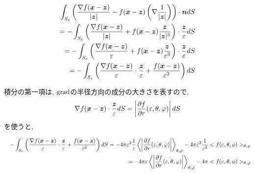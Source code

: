 \documentclass{jsarticle} \usepackage[dvipdfmx]{graphicx} \usepackage[dvipdfmx]{hyperref}
\newcommand*{\mbold}[1]{\mbox{\boldmath $#1$}}
\newcommand*{\grad}{{\rm grad}}
\begin{document}
\begin{eqnarray}
  \int_{S_\varepsilon} \left( \frac{\nabla f(\mbold{x} - \mbold{z})}{|\mbold{z}|} - f(\mbold{x} - \mbold{z})\left( \nabla \frac{1}{|\mbold{z}|} \right) \right) \cdot \mbold{n} dS \nonumber \\
  =
  - \int_{S_\varepsilon} \left( \frac{\nabla f(\mbold{x} - \mbold{z})}{|\mbold{z}|} + f(\mbold{x} - \mbold{z}) \frac{\mbold{z}}{|\mbold{z}|^3} \right) \cdot \frac{\mbold{z}}{\varepsilon} dS \nonumber \\
  =
  - \int_{S_\varepsilon} \left( \frac{\nabla f(\mbold{x} - \mbold{z})}{\varepsilon} + f(\mbold{x} - \mbold{z}) \frac{\mbold{z}}{\varepsilon^3} \right) \cdot \frac{\mbold{z}}{\varepsilon} dS \nonumber \\
  =
  - \int_{S_\varepsilon} \left( \frac{\nabla f(\mbold{x} - \mbold{z})}{\varepsilon} \cdot \frac{\mbold{z}}{\varepsilon} + \frac{f(\mbold{x} - \mbold{z})}{\varepsilon^2} \right) dS 
\end{eqnarray}

積分の第一項は, $\grad$の半径方向の成分の大きさを表すので, 
\begin{equation}
  \nabla f(\mbold{x} - \mbold{z}) \cdot \frac{\mbold{z}}{\varepsilon} dS
  = 
  \left| \frac{\partial f}{\partial r}(\varepsilon, \theta, \varphi) \right|dS
\end{equation}
を使うと, 

\begin{eqnarray}\label{eq-11}
  && - \int_{S_\varepsilon} \left( \frac{\nabla f(\mbold{x} - \mbold{z})}{\varepsilon} \cdot \frac{\mbold{z}}{\varepsilon} + \frac{f(\mbold{x} - \mbold{z})}{\varepsilon^2} \right) dS 
  =
  -4 \pi \varepsilon^2 \frac{1}{\varepsilon} \left< \left| \frac{\partial f}{\partial r}(\varepsilon, \theta, \varphi) \right| \right>_{\theta, \varphi}
  -4 \pi \varepsilon^2 \frac{1}{\varepsilon^2} <f(\varepsilon, \theta, \phi)>_{\theta, \varphi}
  \nonumber \\
  && = -4 \pi \varepsilon \left< \left| \frac{\partial f}{\partial r}(\varepsilon, \theta, \varphi) \right| \right>_{\theta, \varphi}
  -4 \pi <f(\varepsilon, \theta, \phi)>_{\theta, \varphi}
\end{eqnarray}
\end{document}
